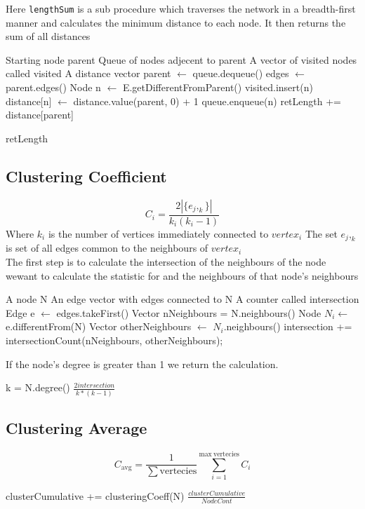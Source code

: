 \documentclass[a4paper,11pt,titlepage]{article}
\newcommand{\code}[1]{\texttt{#1}}
\begin{document}
Here \code{lengthSum} is a sub procedure which traverses the network in a
breadth-first manner and calculates the minimum distance to each node.
It then returns the sum of all distances

\begin{algorithmic}
\REQUIRE Starting node parent
\REQUIRE Queue of nodes adjecent to parent
\REQUIRE A vector of visited nodes called visited
\REQUIRE A distance vector
	\STATE parent $\gets$ queue.dequeue()
	\STATE edges $\gets$ parent.edges()
	\STATE Node n $\gets$ E.getDifferentFromParent()
			\STATE visited.insert(n)
			\STATE distance[n] $\gets$ distance.value(parent, 0) + 1
			\STATE queue.enqueue(n)
		\ENDIF
	\ENDFOR
	\STATE retLength += distance[parent]
\ENDWHILE

\RETURN retLength
\end{algorithmic}
\subsection{Clustering Coefficient}
\[
C_i = \frac{2|\{e_j,_k\}|}{k_i(k_i-1)}
\]
Where $k_i$ is the number of vertices immediately connected to $vertex_i$
\newline
The set ${e_j,_k}$ is set of all edges common to the neighbours of $vertex_i$\\

The first step is to calculate the intersection of the neighbours of the node wewant to calculate the statistic for and the neighbours of that node's neighbours
\begin{algorithmic}
\REQUIRE A node N
\REQUIRE An edge vector with edges connected to N
\REQUIRE A counter called intersection
	\STATE Edge e $\gets$ edges.takeFirst()
	\STATE Vector nNeighbours = N.neighbours()
	\STATE Node $N_i \gets$ e.differentFrom(N)
	\STATE Vector otherNeighbours $\gets$  $N_i$.neighbours()
	\STATE  intersection += intersectionCount(nNeighbours, otherNeighbours);
\ENDWHILE
\end{algorithmic}
If the node's degree is greater than 1 we return the calculation.
\begin{algorithmic}
\REQUIRE k = N.degree()
	\RETURN $\frac{2intersection}{k*(k-1)}$
\ELSE
\ENDIF
\end{algorithmic}

\subsection{Clustering Average}
\[
C_\mathrm{avg} = \frac{1}{\mathrm{\sum vertecies}}\sum_{i=1}^{\mathrm{max\
vertecies}} C_i
\]
\begin{algorithmic}
	\STATE clusterCumulative += clusteringCoeff(N)
\ENDFOR
\RETURN $\frac{clusterCumulative}{Node Cont}$
\end{algorithmic}
\end{document}
